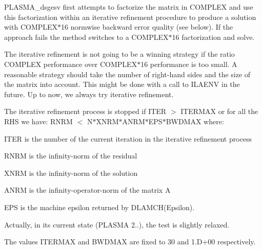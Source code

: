 P\+L\+A\+S\+M\+A\+\_\+dsgesv first attempts to factorize the matrix in C\+O\+M\+P\+L\+E\+X and use this factorization within an iterative refinement procedure to produce a solution with C\+O\+M\+P\+L\+E\+X$\ast$16 normwise backward error quality (see below). If the approach fails the method switches to a C\+O\+M\+P\+L\+E\+X$\ast$16 factorization and solve.

The iterative refinement is not going to be a winning strategy if the ratio C\+O\+M\+P\+L\+E\+X performance over C\+O\+M\+P\+L\+E\+X$\ast$16 performance is too small. A reasonable strategy should take the number of right-\/hand sides and the size of the matrix into account. This might be done with a call to I\+L\+A\+E\+N\+V in the future. Up to now, we always try iterative refinement.

The iterative refinement process is stopped if I\+T\+E\+R $>$ I\+T\+E\+R\+M\+A\+X or for all the R\+H\+S we have\+: R\+N\+R\+M $<$ N$\ast$\+X\+N\+R\+M$\ast$\+A\+N\+R\+M$\ast$\+E\+P\+S$\ast$\+B\+W\+D\+M\+A\+X where\+:


\begin{DoxyItemize}
\item I\+T\+E\+R is the number of the current iteration in the iterative refinement process
\item R\+N\+R\+M is the infinity-\/norm of the residual
\item X\+N\+R\+M is the infinity-\/norm of the solution
\item A\+N\+R\+M is the infinity-\/operator-\/norm of the matrix A
\item E\+P\+S is the machine epsilon returned by D\+L\+A\+M\+C\+H(\textquotesingle{}Epsilon\textquotesingle{}).
\end{DoxyItemize}

Actually, in its current state (P\+L\+A\+S\+M\+A 2..), the test is slightly relaxed.

The values I\+T\+E\+R\+M\+A\+X and B\+W\+D\+M\+A\+X are fixed to 30 and 1.\+D+00 respectively.


